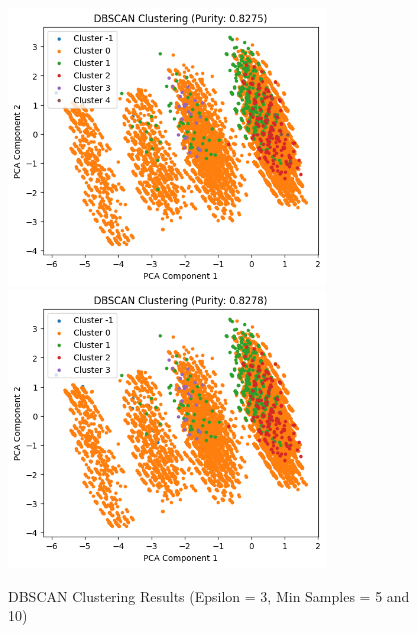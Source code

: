 \documentclass{article}
\begin{document}
\begin{figure}[H]\ContinuedFloat
\centering
\includegraphics[width=0.75\textwidth]{DBScan_3_5.png}
\includegraphics[width=0.75\textwidth]{DBScan_3_10.png}
\caption{DBSCAN Clustering Results (Epsilon = 3, Min Samples = 5 and 10)}
\end{figure}
\end{document}
